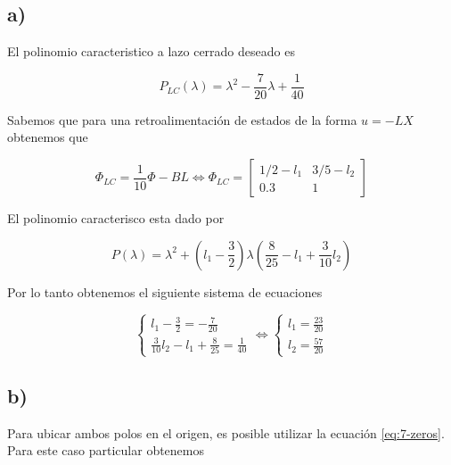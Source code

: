 \documentclass[11pt,a4paper]{article}
\newcommand{\siseq}[1]{ \left\{ \begin{array}{c}
    #1
\end{array} \right. }
\begin{document}
       \subsection*{a)}

       El polinomio caracteristico a lazo cerrado deseado es 

       \begin{equation}
           P_{LC}(\lambda) = \lambda^2 - \frac{7}{20} \lambda + \frac{1}{40}
       \end{equation}

       Sabemos que para una retroalimentación de estados de la forma $u=-LX$ obtenemos que 
       
       \begin{equation}
           \Phi_{LC} = \frac{1}{10} \Phi - BL \Leftrightarrow
           \Phi_{LC} = 
           \begin{bmatrix}
               1/2 - l_1 & 3/5 - l_2 \\
               0.3 & 1
           \end{bmatrix}
       \end{equation}


       El polinomio caracterisco esta dado por 

       \begin{equation}
           P(\lambda) = \lambda^2 + \left( l_1 - \frac{3}{2} \right) \lambda \left( 
               \frac{8}{25} - l_1 + \frac{3}{10}l_2
            \right)
       \end{equation}

       Por lo tanto obtenemos el siguiente sistema de ecuaciones 

       \begin{equation}
           \siseq{
               l_1 - \frac{3}{2} = -\frac{7}{20} \\ 
               \frac{3}{10}l_2 - l_1 + \frac{8}{25} = \frac{1}{40}
           } \Leftrightarrow
           \siseq{
               l_1 = \frac{23}{20} \\ 
               l_2 = \frac{57}{20}
           }
       \end{equation}

    \subsection*{b)}

       Para ubicar ambos polos en el origen, es posible utilizar la ecuación \ref{eq:7-zeros}. Para 
       este caso particular obtenemos 
\end{document}
